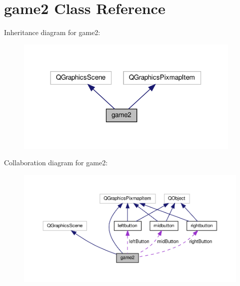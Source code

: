 \hypertarget{classgame2}{}\section{game2 Class Reference}
\label{classgame2}


Inheritance diagram for game2\+:\nopagebreak
\begin{figure}[H]
\begin{center}
\leavevmode
\includegraphics[width=306pt]{classgame2__inherit__graph}
\end{center}
\end{figure}


Collaboration diagram for game2\+:\nopagebreak
\begin{figure}[H]
\begin{center}
\leavevmode
\includegraphics[width=350pt]{classgame2__coll__graph}
\end{center}
\end{figure}
